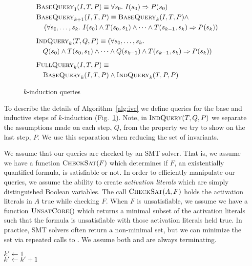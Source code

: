 \begin{figure}
\begin{align*}
  &\bq_1(I, T, P) \equiv \forall s_0.~ I(s_0) \Rightarrow P(s_0) \\
  &\bq_{k+1}(I, T, P) \equiv \bq_k(I, T, P) \land~ \\
%
  &\hspace{10pt}\left(\forall s_0, \ldots, s_k.~ I(s_0) \land T(s_0,
  s_1) \land \cdots \land T(s_{k-1}, s_k) \Rightarrow P(s_k)\right)
  \\[5pt]
  &\iq_k(T, Q, P) \equiv (\forall s_0, \ldots, s_k.~\\
%
  &\hspace{10pt} Q(s_0) \land T(s_0,
  s_1) \land \cdots \land Q(s_{k-1}) \land T(s_{k-1}, s_k) \Rightarrow
  P(s_k)) \\[5pt]
  &\fq_k(I, T, P) \equiv \\
%
  &\hspace{10pt}\bq_k(I, T, P) \land \iq_k(T, P, P)
\end{align*}
\caption{$k$-induction queries}
\label{fig:queries}
\end{figure}

To describe the details of Algorithm~\ref{alg:ivc} we define queries
for the base and inductive steps of $k$-induction
(Fig.~\ref{fig:queries}). Note, in $\textsc{IndQuery}(T, Q, P)$ we separate the
assumptions made on each step, $Q$, from the property we try to show
on the last step, $P$. We use this separation when reducing the set of
invariants.

We assume that our queries are checked by an SMT solver. That is, we
assume we have a function $\textsc{CheckSat}(F)$ which determines if $F$, an
existentially quantified formula, is satisfiable or not. In order to
efficiently manipulate our queries, we assume the ability to create
{\em activation literals} which are simply distinguished Boolean
variables. The call $\textsc{CheckSat}(A, F)$ holds the activation literals in
$A$ true while checking $F$. When $F$ is unsatisfiable, we assume we
have a function $\textsc{UnsatCore}()$ which returns a minimal subset of the
activation literals such that the formula is unsatisfiable with those
activation literals held true. In practice, SMT solvers often return a
non-minimal set, but we can minimize the set via repeated calls to
\checksat. We assume both \checksat and \unsatcore are always
terminating.

\begin{algorithm}[t]
  $k' \leftarrow 1$ \\
   {
    $k' \leftarrow k' + 1$ \\
    }
   \\
\caption{$\mink(T, P)$}
\label{alg:minimize-k}
\end{algorithm}

